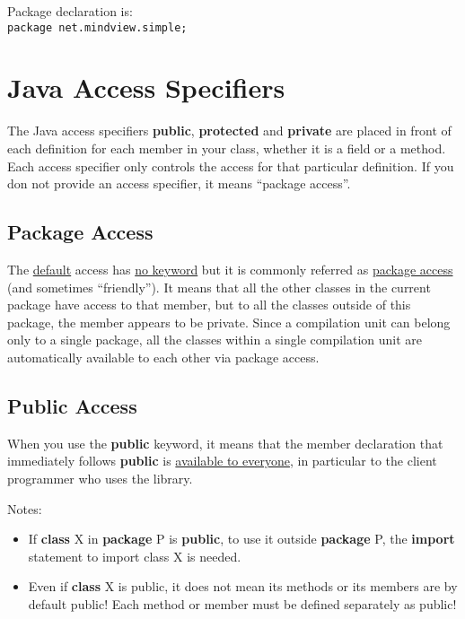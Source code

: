 \documentclass[10pt,letterpaper]{report}
\begin{document}
Package declaration is:\\

\texttt{package net.mindview.simple;}\\

\section{Java Access Specifiers}
The Java access specifiers \textbf{public}, \textbf{protected} and \textbf{private} are placed in front of each definition for each member in your class, whether it is a field or a method.  Each access specifier only controls the access for that particular definition.
If you don not provide an access specifier, it means ``package access''.\\

\subsection{Package Access}
The \underline{default} access has \underline{no keyword} but it is commonly referred as \underline{package access} (and sometimes ``friendly''). It means that all the other classes in the current package have access to that member, but to all the classes outside of this package, the member appears to be private. Since a compilation unit can belong only to a single package, all the classes within a single compilation unit are automatically available to each other via package access.\\

\subsection{Public Access}
When you use the \textbf{public} keyword, it means that the member declaration that immediately follows \textbf{public} is \underline{available to everyone}, in particular to the client programmer who uses the library.

Notes:
\begin{itemize}
\item If \textbf{class} X in \textbf{package} P is \textbf{public}, to use it outside \textbf{package} P, the \textbf{import} statement to import class X is needed.
\item Even if \textbf{class} X is public, it does not mean its methods or its members are by default public! Each method or member must be defined separately as public!
\end{itemize}
\end{document}
